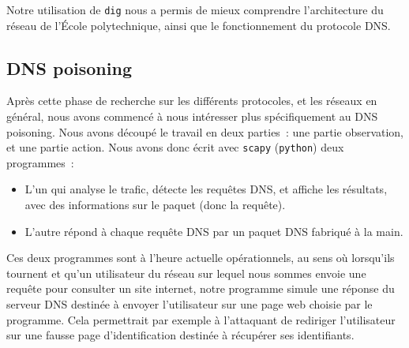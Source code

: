 \documentclass[a4paper, 12pt,twoside]{article}
\begin{document}
    Notre  utilisation de \verb!dig! nous a permis de mieux comprendre l'architecture du réseau de l'École polytechnique, ainsi que le fonctionnement du protocole DNS.

    \subsection{DNS poisoning}

    Après cette phase de recherche sur les différents protocoles, et les réseaux en général, nous avons commencé à nous intéresser plus spécifiquement au DNS poisoning. Nous avons découpé le travail en deux parties~: une partie observation, et une partie action. Nous avons donc écrit avec \verb!scapy! (\verb!python!) deux programmes~:
    \begin{itemize}[label=\color{bleu303}\textbullet{}]
        \item L'un qui analyse le trafic, détecte les requêtes DNS, et affiche les résultats, avec des informations sur le paquet (donc la requête).
        \item L'autre répond à chaque requête DNS par un paquet DNS fabriqué à la main.
    \end{itemize}

    Ces deux programmes sont à l'heure actuelle opérationnels, au sens où lorsqu'ils tournent et qu'un utilisateur du réseau sur lequel nous sommes envoie une requête pour consulter un site internet, notre programme simule une réponse du serveur DNS destinée à envoyer l'utilisateur sur une page web choisie par le programme. Cela permettrait par exemple à l'attaquant de rediriger l'utilisateur sur une fausse page d'identification destinée à récupérer ses identifiants.
\end{document}

